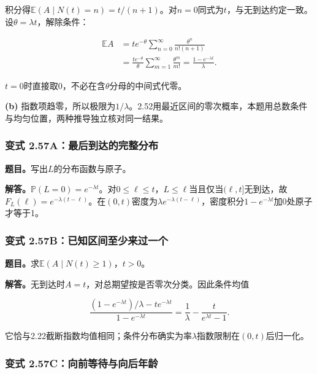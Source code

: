 \documentclass[12pt,a4paper,UTF8,fontset=fandol]{ctexart}
\begin{document}
积分得\(\mathbb E(A\mid N(t)=n)=t/(n+1)\)。对\(n=0\)同式为\(t\)，与无到达约定一致。设\(\theta=\lambda t\)，解除条件：

\[
\begin{aligned}
\mathbb EA
&=t e^{-\theta}\sum_{n=0}^{\infty}\frac{\theta^n}{n!(n+1)}\\
&=\frac{t e^{-\theta}}\theta\sum_{m=1}^{\infty}\frac{\theta^m}{m!}
=\boxed{\frac{1-e^{-\lambda t}}\lambda}.
\end{aligned}
\]

\(t=0\)时直接取0，不必在含\(\theta\)分母的中间式代零。

\textbf{(b)}
指数项趋零，所以极限为\(\boxed{1/\lambda}\)。2.52用最近区间的零次概率，本题用总数条件与均匀位置，两种推导独立核对同一结果。

\subsubsection{变式
2.57A：最后到达的完整分布}\label{ux53d8ux5f0f-2.57aux6700ux540eux5230ux8fbeux7684ux5b8cux6574ux5206ux5e03}

\textbf{题目。}写出\(L\)的分布函数与原子。

\textbf{解答。}\(\mathbb P(L=0)=e^{-\lambda t}\)。对\(0\le \ell\le t\)，\(L\le\ell\)当且仅当\((\ell,t]\)无到达，故\(F_L(\ell)=e^{-\lambda(t-\ell)}\)。在\((0,t)\)密度为\(\lambda e^{-\lambda(t-\ell)}\)，密度积分\(1-e^{-\lambda t}\)加0处原子才等于1。

\subsubsection{变式
2.57B：已知区间至少来过一个}\label{ux53d8ux5f0f-2.57bux5df2ux77e5ux533aux95f4ux81f3ux5c11ux6765ux8fc7ux4e00ux4e2a}

\textbf{题目。}求\(\mathbb E(A\mid N(t)\ge1)\)，\(t>0\)。

\textbf{解答。}无到达时\(A=t\)，对总期望按是否零次分类。因此条件均值

\[\frac{(1-e^{-\lambda t})/\lambda-te^{-\lambda t}}{1-e^{-\lambda t}}
=\frac1\lambda-\frac{t}{e^{\lambda t}-1}.\]

它恰与2.22截断指数均值相同；条件分布确实为率\(\lambda\)指数限制在\((0,t)\)后归一化。

\subsubsection{变式
2.57C：向前等待与向后年龄}\label{ux53d8ux5f0f-2.57cux5411ux524dux7b49ux5f85ux4e0eux5411ux540eux5e74ux9f84}
\end{document}
